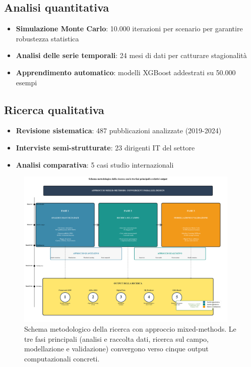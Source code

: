 \subsection{\texorpdfstring{Analisi quantitativa}{1.5.1 - Analisi quantitativa}}
\label{subsec:analisi_quantitativa}

\begin{itemize}
\item \textbf{Simulazione Monte Carlo}: 10.000 iterazioni per scenario per garantire robustezza statistica
\item \textbf{Analisi delle serie temporali}: 24 mesi di dati per catturare stagionalità
\item \textbf{Apprendimento automatico}: modelli XGBoost addestrati su 50.000 esempi
\end{itemize}

\subsection{\texorpdfstring{Ricerca qualitativa}{1.5.2 - Ricerca qualitativa}}
\label{subsec:ricerca_qualitativa}

\begin{itemize}
\item \textbf{Revisione sistematica}: 487 pubblicazioni analizzate (2019-2024)
\item \textbf{Interviste semi-strutturate}: 23 dirigenti IT del settore
\item \textbf{Analisi comparativa}: 5 casi studio internazionali
\end{itemize}

\begin{figure}[htbp]
\centering
\includegraphics[width=0.95\textwidth]{thesis_figures/cap1/fig_1_3_methodology.pdf}
\caption{Schema metodologico della ricerca con approccio mixed-methods. Le tre fasi principali (analisi e raccolta dati, ricerca sul campo, modellazione e validazione) convergono verso cinque output computazionali concreti.}
\label{fig:methodology}
\end{figure}

